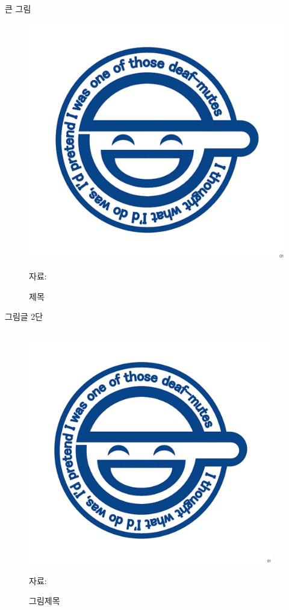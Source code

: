 \documentclass[aspectratio=169,xcolor=dvipsnames,presentation]{beamer}
\begin{document}
\begin{frame}{큰 그림}
\centering
\begin{figure}
    \includegraphics[width=.3\textwidth]{pic/smileman.png}
    \\
    \raggedright %
    \hspace{1em} %
    \tiny{자료: } %
    \caption{제목}
\end{figure}
\end{frame}

\begin{frame}{그림글 2단}
\begin{columns}
    \begin{column}{.5\textwidth}
        \begin{figure}
            \centering
            \includegraphics[width=.7\textwidth]{pic/smileman.png}
            \\
            \raggedright
            \hspace{1em}
            \tiny{자료:}
            \caption{그림제목}
        \end{figure}
    \end{column}

    \begin{column}{.5\textwidth}
    \end{column}
\end{columns}
\end{frame}
\end{document}
